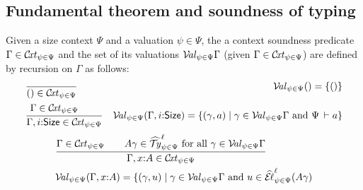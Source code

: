 \documentclass[acmsmall,screen]{acmart}\settopmatter{}
\renewcommand{\sext}[3]{(#1,#3/#2)}
\renewcommand{\cext}[3]{#1,#2{:}#3}
\begin{document}
\subsection{Fundamental theorem and soundness of typing}

Given a size context $\Psi$ and a valuation $\psi \in \Psi$, the a
context soundness predicate $\Gamma \in \mathcal{C}\kern-0.4ex\mathit{xt}_{\psi\in\Psi}$ and the set of
its valuations $\mathcal{V}\kern-0.4ex\mathit{al}_{\psi\in\Psi} \Gamma$ (given $\Gamma \in \mathcal{C}\kern-0.4ex\mathit{xt}_{\psi\in\Psi}$)
are defined by recursion on
$\Gamma$ as follows:
\begin{align*}
  & \ru{}{\cempty \in \CXT \Psi \psi}
  & \VAL \Psi \psi \cempty = \{ \cempty \}
\\
  & \ru{\Gamma \in \CXT \Psi \psi \qquad
      }{\cext \Gamma i \Size \in \CXT \Psi \psi}
  & \VAL \Psi \psi (\cext \Gamma i \Size) = \{ (\gamma,a) \mid
      \gamma \in \VAL \Psi \psi \Gamma \mand
      \Psi \der a \}
\end{align*}
\begin{align*}
  & \ru{\Gamma \in \CXT \Psi \psi \qquad
        A\gamma \in \TYhat \Psi \psi \ell
        \mforall \gamma \in \VAL \Psi \psi \Gamma
      }{\cext \Gamma x A \in \CXT \Psi \psi}
\\
  & \VAL \Psi \psi (\cext \Gamma x A) = \{ (\gamma,u) \mid
      \gamma \in \VAL \Psi \psi \Gamma \mand
      u \in \ELhat \Psi \psi \ell {A\gamma}
\end{align*}

\end{document}
